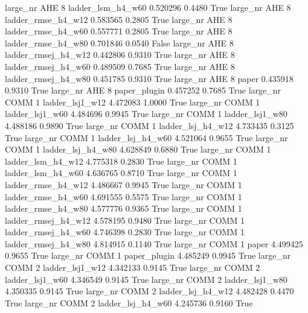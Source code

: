   large_nr      AHE                 8   ladder_lsm_h4_w60   0.520296      0.4480    True
  large_nr      AHE                 8  ladder_rmse_h4_w12   0.583565      0.2805    True
  large_nr      AHE                 8  ladder_rmse_h4_w60   0.557771      0.2805    True
  large_nr      AHE                 8  ladder_rmse_h4_w80   0.701846      0.0540   False
  large_nr      AHE                 8 ladder_rmsej_h4_w12   0.442806      0.9310    True
  large_nr      AHE                 8 ladder_rmsej_h4_w60   0.489509      0.7685    True
  large_nr      AHE                 8 ladder_rmsej_h4_w80   0.451785      0.9310    True
  large_nr      AHE                 8               paper   0.435918      0.9310    True
  large_nr      AHE                 8        paper_plugin   0.457252      0.7685    True
  large_nr     COMM                 1     ladder_lsj1_w12   4.472083      1.0000    True
  large_nr     COMM                 1     ladder_lsj1_w60   4.484696      0.9945    True
  large_nr     COMM                 1     ladder_lsj1_w80   4.488186      0.9890    True
  large_nr     COMM                 1   ladder_lsj_h4_w12   4.733435      0.3125    True
  large_nr     COMM                 1   ladder_lsj_h4_w60   4.521064      0.9655    True
  large_nr     COMM                 1   ladder_lsj_h4_w80   4.628849      0.6880    True
  large_nr     COMM                 1   ladder_lsm_h4_w12   4.775318      0.2830    True
  large_nr     COMM                 1   ladder_lsm_h4_w60   4.636765      0.8710    True
  large_nr     COMM                 1  ladder_rmse_h4_w12   4.486667      0.9945    True
  large_nr     COMM                 1  ladder_rmse_h4_w60   4.691555      0.5575    True
  large_nr     COMM                 1  ladder_rmse_h4_w80   4.577776      0.9365    True
  large_nr     COMM                 1 ladder_rmsej_h4_w12   4.578195      0.9480    True
  large_nr     COMM                 1 ladder_rmsej_h4_w60   4.746398      0.2830    True
  large_nr     COMM                 1 ladder_rmsej_h4_w80   4.814915      0.1140    True
  large_nr     COMM                 1               paper   4.499425      0.9655    True
  large_nr     COMM                 1        paper_plugin   4.485249      0.9945    True
  large_nr     COMM                 2     ladder_lsj1_w12   4.342133      0.9145    True
  large_nr     COMM                 2     ladder_lsj1_w60   4.346549      0.9145    True
  large_nr     COMM                 2     ladder_lsj1_w80   4.350335      0.9145    True
  large_nr     COMM                 2   ladder_lsj_h4_w12   4.482428      0.4470    True
  large_nr     COMM                 2   ladder_lsj_h4_w60   4.245736      0.9160    True
